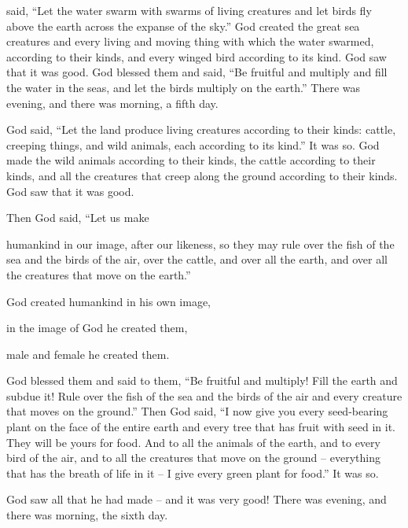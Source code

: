 {said,
“Let the water
swarm
with swarms
of living
creatures
and let birds
fly
above
the earth
across
the expanse
of the sky.”
God
created
the great
sea creatures
and every
living
and moving thing
with which
the water
swarmed,
according to their kinds,
and every
winged
bird
according to its kind.
God
saw
that
it was good.
God
blessed
them
and said,
“Be fruitful
and multiply
and fill
the
water
in the seas,
and let the birds
multiply
on the earth.”
There was
evening,
and there was
morning,
a fifth
day.
\par }{\PP {}God
said,
“Let the land
produce living
creatures
according to their kinds: cattle,
creeping things,
and wild animals,
each according to its kind.”
It was so.
God
made
the wild animals
according
to their kinds,
the cattle
according to their kinds,
and all
the creatures that creep
along the ground
according to their kinds.
God
saw
that
it was good.
\par }{\PP {}Then God
said,
“Let us make
\par }{\PP humankind
in our image,
after our likeness,
so they may rule
over the fish
of the sea
and the birds
of the air,
over the cattle,
and over all
the earth,
and over all
the creatures
that move
on
the earth.”
\par }{\Q {}God
created
humankind
in his own image,
\par }{\Q in the image
of God
he created
them,

\par }{\Q male
and female
he created them.
\par }{\PP {}God
blessed
them
and said
to them, “Be fruitful
and multiply! Fill
the
earth
and subdue
it! Rule
over the fish
of the sea
and the birds
of the air
and every
creature
that moves
on
the ground.”
Then God
said,
“I now
give
you every
seed-bearing
plant
on
the face
of the entire
earth
and every
tree
that has
fruit
with seed
in it. They will be
yours for food.
And to all
the animals
of the earth,
and to every
bird
of the air,
and to all
the creatures that move
on
the ground
– everything that has
the breath
of life in it – I give every green plant for food.” It was so.
\par }{\PP {}God
saw
all
that he had
made
– and it was
very
good! There was
evening,
and there was
morning,
the sixth
day.

}

